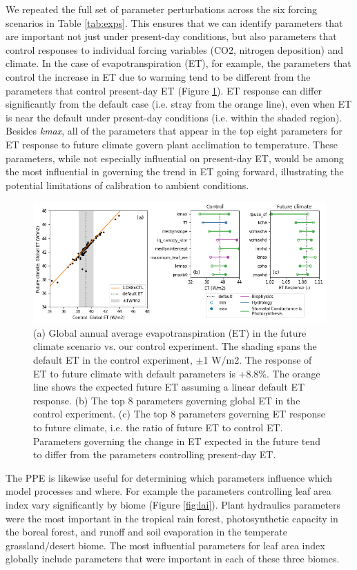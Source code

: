 \documentclass[draft]{agujournal2019}
\begin{document}
We repeated the full set of parameter perturbations across the six forcing scenarios in Table \ref{tab:exps}. This ensures that we can identify parameters that are important not just under present-day conditions, but also parameters that control responses to individual forcing variables (CO2, nitrogen deposition) and climate.  In the case of evapotranspiration (ET), for example, the parameters that control the increase in ET due to warming tend to be different from the parameters that control present-day ET (Figure \ref{fig:et}). 
ET response can differ significantly from the default case (i.e. stray from the orange line), even when ET is near the default under present-day conditions (i.e. within the shaded region).
Besides \textit{kmax}, all of the parameters that appear in the top eight parameters for ET response to future climate govern plant acclimation to temperature. 
These parameters, while not especially influential on present-day ET, would be among the most influential in governing the trend in ET going forward, illustrating the potential limitations of calibration to ambient conditions.

\begin{figure}[h]
\centering
\includegraphics[width=\textwidth]{../figs/ET_response.png}
\caption{(a) Global annual average evapotranspiration (ET) in the future climate scenario vs. our control experiment. The shading spans the default ET in the control experiment, $\pm$1 W/m2. The response of ET to future climate with default parameters is +8.8\%. The orange line shows the expected future ET assuming a linear default ET response. 
(b) The top 8 parameters governing global ET in the control experiment.
(c) The top 8 parameters governing ET response to future climate, i.e. the ratio of future ET to control ET.
Parameters governing the change in ET expected in the future tend to differ from the parameters controlling present-day ET.}
\label{fig:et}
\end{figure}

The PPE is likewise useful for determining which parameters influence which model processes and where. For example the parameters controlling leaf area index vary significantly by biome (Figure \ref{fig:lai}). Plant hydraulics parameters were the most important in the tropical rain forest, photosynthetic capacity in the boreal forest, and runoff and soil evaporation in the temperate grassland/desert biome. The most influential parameters for leaf area index globally include parameters that were important in each of these three biomes. 
\end{document}
